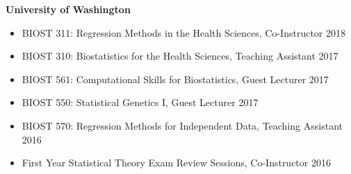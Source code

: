 \documentclass[margin]{res}
\begin{document}
\begin{resume}
\newpage
\textbf{University of Washington}
\begin{itemize}
\item BIOST 311: Regression Methods in the Health Sciences, Co-Instructor \hfill  2018 
\item BIOST 310: Biostatistics for the Health Sciences, Teaching Assistant  \hfill 2017 
\item BIOST 561: Computational Skills for Biostatistics, Guest Lecturer \hfill 2017
\item BIOST 550: Statistical Genetics I, Guest Lecturer  \hfill 2017 
\item BIOST 570: Regression Methods for Independent Data, Teaching Assistant  \hfill 2016 
\item First Year Statistical Theory Exam Review Sessions, Co-Instructor  \hfill 2016 
\end{itemize}



\end{resume}
\end{document}
